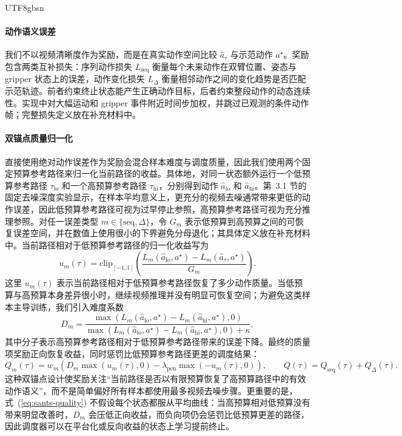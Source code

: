 \documentclass{article}
\begin{document}
\begin{CJK*}{UTF8}{gbsn}
\paragraph{动作语义误差}
我们不以视频清晰度作为奖励，而是在真实动作空间比较 \(\hat{a}_{\tau}\) 与示范动作 \(a^{\star}\)。奖励包含两类互补损失：序列动作损失 \(L_{\mathrm{seq}}\) 衡量每个未来动作在双臂位置、姿态与 gripper 状态上的误差，动作变化损失 \(L_{\Delta}\) 衡量相邻动作之间的变化趋势是否匹配示范轨迹。前者约束终止状态能产生正确动作目标，后者约束整段动作的动态连续性。实现中对大幅运动和 gripper 事件附近时间步加权，并跳过已观测的条件动作帧；完整损失定义放在补充材料中。

\paragraph{双锚点质量归一化}
直接使用绝对动作误差作为奖励会混合样本难度与调度质量，因此我们使用两个固定预算参考路径来归一化当前路径的收益。具体地，对同一状态额外运行一个低预算参考路径 \(\tau_{\mathrm{lo}}\) 和一个高预算参考路径 \(\tau_{\mathrm{hi}}\)，分别得到动作 \(\hat{a}_{\mathrm{lo}}\) 和 \(\hat{a}_{\mathrm{hi}}\)。第~3.1 节的固定去噪深度实验显示，在样本平均意义上，更充分的视频去噪通常带来更低的动作误差，因此低预算参考路径可视为过早停止参照，高预算参考路径可视为充分推理参照。对任一误差类型 \(m\in\{\mathrm{seq},\Delta\}\)，令 \(G_m\) 表示低预算到高预算之间的可恢复误差空间，并在数值上使用很小的下界避免分母退化；其具体定义放在补充材料中。当前路径相对于低预算参考路径的归一化收益写为
\begin{equation}
u_m(\tau)=
\mathrm{clip}_{[-1,1]}\!
\left(
\frac{
L_m(\hat{a}_{\mathrm{lo}},a^{\star}) -
L_m(\hat{a}_{\tau},a^{\star})
}{G_m}
\right).
\label{eq:sants-anchor-gain}
\end{equation}
这里 \(u_m(\tau)\) 表示当前路径相对于低预算参考路径恢复了多少动作质量。当低预算与高预算本身差异很小时，继续视频推理并没有明显可恢复空间；为避免这类样本主导训练，我们引入难度系数
\begin{equation}
D_m =
\frac{
\max\!\left(L_m(\hat{a}_{\mathrm{lo}},a^{\star}) -
L_m(\hat{a}_{\mathrm{hi}},a^{\star}), 0\right)}
{
\max\!\left(L_m(\hat{a}_{\mathrm{lo}},a^{\star}) -
L_m(\hat{a}_{\mathrm{hi}},a^{\star}), 0\right) + \kappa},
\label{eq:sants-difficulty}
\end{equation}
其中分子表示高预算参考路径相对于低预算参考路径带来的误差下降。最终的质量项奖励正向恢复收益，同时惩罚比低预算参考路径更差的调度结果：
\begin{equation}
Q_m(\tau)=
w_m\left(
D_m\max(u_m(\tau),0)
-\lambda_{\mathrm{pen}}\max(-u_m(\tau),0)
\right),
\qquad
Q(\tau)=Q_{\mathrm{seq}}(\tau)+Q_{\Delta}(\tau).
\label{eq:sants-quality}
\end{equation}
这种双锚点设计使奖励关注“当前路径是否以有限预算恢复了高预算路径中的有效动作语义”，而不是简单偏好所有样本都使用最多视频去噪步骤。更重要的是，式~(\ref{eq:sants-quality}) 不假设每个状态都服从平均曲线：当高预算相对低预算没有带来明显改善时，\(D_m\) 会压低正向收益，而负向项仍会惩罚比低预算更差的路径，因此调度器可以在平台化或反向收益的状态上学习提前终止。


\end{CJK*}
\end{document}
